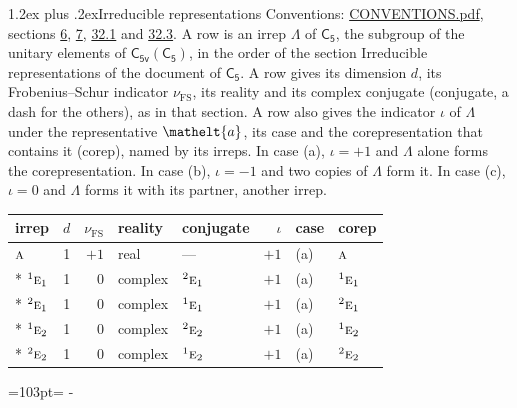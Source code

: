 \documentclass[10pt,a4paper]{article}
\makeatletter
\renewcommand\section{\@startsection{section}{1}{\z@}{-3ex plus -1ex minus -.2ex}%
  {1.2ex plus .2ex}{\normalfont\large\sffamily\bfseries\color{parttitle}}}
\newcommand{\needspace}[1]{\par\penalty-100\begingroup\dimen0=#1\relax\dimen2=\pagegoal
  \advance\dimen2-\pagetotal\ifdim\dimen0>\dimen2\relax\ifdim\dimen2>0pt\vfil\break\fi\fi
  \endgroup}
\numberwithin{equation}{section}
\newcommand{\eltfont}[1]{{\let\sigma\eltsigma\mathelt{#1}}}
\newcommand{\grp}[1]{\mathsf{#1}}
\newcommand{\irr}[1]{\text{\normalfont\scshape #1}}
\newcommand{\conjpair}[1]{{}^{#1}}
\newcommand{\elt}[1]{\eltfont{#1}}
\newcommand{\fsind}{\nu_{\mathrm{FS}}}
\makeatother
\begin{document}
\section{Irreducible representations}\label{s:irreps}
Conventions: \href{../../CONVENTIONS.pdf}{CONVENTIONS.pdf}, sections \href{../../../rotation/CONVENTIONS.pdf\#conv.6}{6}, \href{../../../rotation/CONVENTIONS.pdf\#conv.7}{7}, \href{../../CONVENTIONS.pdf\#conv.32.1}{32.1} and \href{../../CONVENTIONS.pdf\#conv.32.3}{32.3}.
\leavevmode\label{n:irrep.Delta}A row is an irrep $\Lambda$ of $\grp{C_{5}}$, the subgroup of the unitary elements of $\grp{C_{5v}}(\grp{C_{5}})$, in the order of the section Irreducible representations of the document of \href{../../../rotation/data/pdf/C5.pdf}{$\grp{C_{5}}$}. \label{n:index.dimension}\label{n:index.frobenius}\label{n:head.irrep}\label{n:head.reality}\label{n:head.conjugate}A row gives its dimension $d$, its Frobenius--Schur indicator $\fsind$, its reality and its complex conjugate (conjugate, a dash for the others), as in that section. \label{n:head.case.corep}\label{n:head.corep}A row also gives the indicator $\iota$ of $\Lambda$ under the representative $\elt{a}$, its case and the corepresentation that contains it (corep), named by its irreps. In case (a), $\iota = +1$ and $\Lambda$ alone forms the corepresentation. In case (b), $\iota = -1$ and two copies of $\Lambda$ form it. In case (c), $\iota = 0$ and $\Lambda$ forms it with its partner, another irrep.
\setlength{\emergencystretch}{2em}\par\setlength{\emergencystretch}{0pt}
{\small\renewcommand{\arraystretch}{1.25}\setlength{\tabcolsep}{4pt}\begin{longtable}{@{}lrrllrll@{}}\toprule
irrep & $d$ & $\fsind$ & reality & conjugate & $\iota$ & case & corep\\\midrule\endhead
\bottomrule\endfoot\endlastfoot
$\irr{a}$ & 1 & $+1$ & real & --- & $+1$ & (a) & $\irr{a}$\\*
$\conjpair{1}\irr{e}_{1}$ & 1 & $0$ & complex & $\conjpair{2}\irr{e}_{1}$ & $+1$ & (a) & $\conjpair{1}\irr{e}_{1}$\\*
$\conjpair{2}\irr{e}_{1}$ & 1 & $0$ & complex & $\conjpair{1}\irr{e}_{1}$ & $+1$ & (a) & $\conjpair{2}\irr{e}_{1}$\\*
$\conjpair{1}\irr{e}_{2}$ & 1 & $0$ & complex & $\conjpair{2}\irr{e}_{2}$ & $+1$ & (a) & $\conjpair{1}\irr{e}_{2}$\\*
$\conjpair{2}\irr{e}_{2}$ & 1 & $0$ & complex & $\conjpair{1}\irr{e}_{2}$ & $+1$ & (a) & $\conjpair{2}\irr{e}_{2}$\\
\bottomrule\end{longtable}}
\needspace{103pt}
\end{document}
